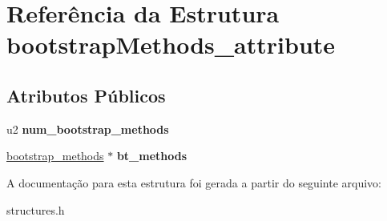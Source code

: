 \hypertarget{structbootstrapMethods__attribute}{}\section{Referência da Estrutura bootstrap\+Methods\+\_\+attribute}
\label{structbootstrapMethods__attribute}
\subsection*{Atributos Públicos}
\begin{DoxyCompactItemize}
\item 
\mbox{\label{structbootstrapMethods__attribute_aad5dc2c56be879fe48451587b71c6715}} 
u2 {\bfseries num\+\_\+bootstrap\+\_\+methods}
\item 
\mbox{\label{structbootstrapMethods__attribute_a602dcc74faa430494a9c300edf2a74c3}} 
\hyperlink{structbootstrap__methods}{bootstrap\+\_\+methods} $\ast$ {\bfseries bt\+\_\+methods}
\end{DoxyCompactItemize}


A documentação para esta estrutura foi gerada a partir do seguinte arquivo\+:\begin{DoxyCompactItemize}
\item 
structures.\+h\end{DoxyCompactItemize}
